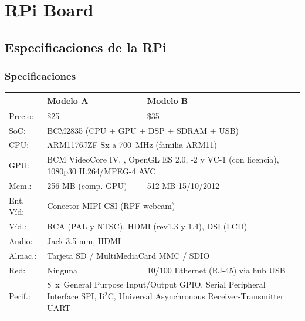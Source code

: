 \documentclass[10pt,colorlinks]{beamer}
\begin{document}
\section{RPi Board}
\subsection{Especificaciones de la RPi}
\begin{frame}[allowframebreaks]\frametitle{Specificaciones}
\small \begin{longtable}[c]{|p{1.3cm}||p{7cm}|p{2.1cm}|} \hline  
& Modelo A & Modelo B
\\  
\hline \hline  
Precio: & \$25 & \$35
\\   \hline

SoC:&\multicolumn{2}{p{9cm}|}{ BCM2835 (CPU + GPU
+  DSP + SDRAM +
USB)}
\\  \hline
 
CPU: & \multicolumn{2}{p{9cm}|}{ ARM1176JZF-Sx a 700~MHz (familia
ARM11)}
\\ \hline
  
GPU: & \multicolumn{2}{p{9cm}|}{ BCM VideoCore IV, , OpenGL ES 2.0, -2 y
VC-1 (con licencia), 1080p30
H.264/MPEG-4 AVC}
\\ \hline
  
Mem.: & 256 MB (comp. GPU) & 512 MB
15/10/2012
\\ \hline
  
 
Ent. Víd: & \multicolumn{2}{p{9cm}|}{ Conector MIPI
CSI (RPF webcam)}
\\ \hline
  
Víd.: &  \multicolumn{2}{p{9cm}|}{ RCA  (PAL
y NTSC), HDMI (rev1.3 y 1.4), 
DSI (LCD)}

\\ \hline
  
Audio: & \multicolumn{2}{p{9cm}|}{ Jack  3.5
mm, HDMI}
\\ \hline
  
Almac.: & \multicolumn{2}{p{9cm}|}{ Tarjeta SD /
MultiMediaCard MMC / SDIO}
\\ \hline
  
Red: & Ninguna & 10/100 Ethernet
(RJ-45) via hub USB
\\ \hline
  
Perif.: &\multicolumn{2}{p{9cm}|}{ 
8~x~General Purpose Input/Output GPIO,
Serial Peripheral Interface SPI, Ii$^2$C,
Universal Asynchronous Receiver-Transmitter UART}
\\  \hline
 

\end{longtable}
\end{frame}
\end{document}
